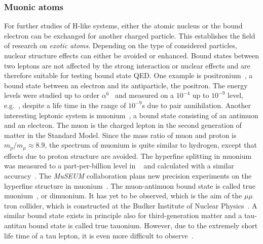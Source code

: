\subsubsection*{Muonic atoms}
For further studies of H-like systems, either the atomic nucleus or the bound electron can be exchanged for another charged particle. This establishes the field of research on \textit{exotic atoms}. Depending on the type of considered particles, nuclear structure effects can either be avoided or enhanced. Bound states between two leptons are not affected by the strong interaction or nuclear effects and are therefore suitable for testing bound state QED. 
One example is positronium~\cite{karshenboim2004}, a bound state between an electron and its antiparticle, the positron. The energy levels were studied up to order $\alpha^6$~\cite{pineda1998,pachucki1998,czarnecki1999,zatorski2008} and measured on a $10^{-4}$ up to $10^{-9}$ level, e.g.~\cite{mills1975,ritter1984,danzmann1989,hagena1993,fee1993}, despite a life time in the range of $10^{-9}$s due to pair annihilation. 
Another interesting leptonic system is muonium~\cite{jungmann2004}, a bound state consisting of an antimuon and an electron. The muon is the charged lepton in the second generation of matter in the Standard Model. Since the mass ratio of muon and proton is $m_p/m_\mu \approx 8.9$, the spectrum of muonium is quite similar to hydrogen, except that effects due to proton structure are avoided. The hyperfine splitting in muonium was measured to a part-per-billion level in ~\cite{casperson1975,liu1999} and calculated with a similar accuracy~\cite{pachucki1996,Karshenboim1996,sapirstein1997,nio1997,eides1998}. The \textit{MuSEUM} collaboration plans new precision experiments on the hyperfine structure in muonium~\cite{museum}. 
The muon-antimuon bound state is called true muonium~\cite{brodsky2009}, or dimuonium. It has yet to be observed, which is the aim of the $\mu\mu$tron collider, which is constructed at the Budker Institute of Nuclear Physics~\cite{bogomyagkov2017}. 
A similar bound state exists in principle also for third-generation matter and a tau-antitau bound state is called true tauonium. However, due to the extremely short life time of a tau lepton, it is even more difficult to observe~\cite{brodsky2009}.


